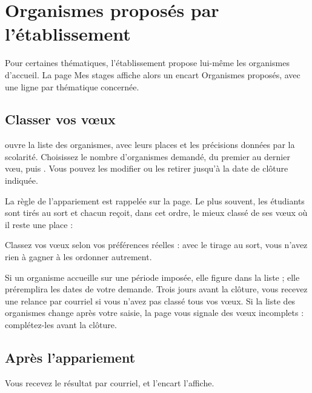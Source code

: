 \documentclass[11pt,a4paper]{article}
\begin{document}
\section{Organismes proposés par l'établissement}
\label{sec:organismes}

Pour certaines thématiques, l'établissement propose lui-même les organismes
d'accueil. La page \og Mes stages\fg{} affiche alors un encart \og Organismes
proposés\fg{}, avec une ligne par thématique concernée.


\subsection{Classer vos vœux}

 ouvre la liste des organismes, avec leurs places et les
précisions données par la scolarité. Choisissez le nombre d'organismes demandé,
du premier au dernier vœu, puis . Vous pouvez les
modifier ou les retirer jusqu'à la date de clôture indiquée.


La règle de l'appariement est rappelée sur la page. Le plus souvent, les
étudiants sont tirés au sort et chacun reçoit, dans cet ordre, le mieux classé de
ses vœux où il reste une place :

\begin{attention}
Classez vos vœux selon vos préférences réelles : avec le tirage au sort, vous
n'avez rien à gagner à les ordonner autrement.
\end{attention}

Si un organisme accueille sur une période imposée, elle figure dans la liste ;
elle préremplira les dates de votre demande. Trois jours avant la clôture, vous
recevez une relance par courriel si vous n'avez pas classé tous vos vœux. Si la
liste des organismes change après votre saisie, la page vous signale des vœux
incomplets : complétez-les avant la clôture.

\subsection{Après l'appariement}

Vous recevez le résultat par courriel, et l'encart l'affiche.
\end{document}
